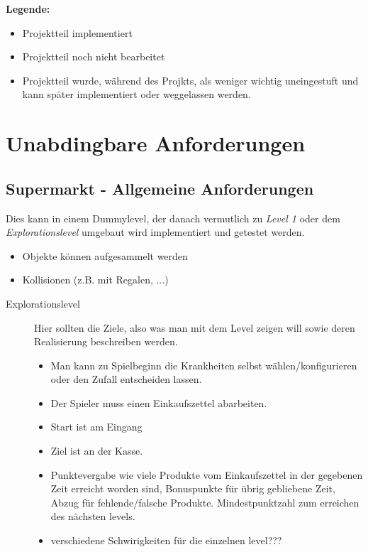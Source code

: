 ﻿\documentclass[a4paper, 11pt]{scrartcl}
\title{\documenttitle}
\author{\authors}
\date{\dateversion}
\newcommand{\fertig}{\color{ForestGreen}}
\newcommand{\unwichtig}{\color{Gray}}
\begin{document}
\maketitle

{\bfseries Legende:}
\begin{itemize}
    \item {\fertig Projektteil implementiert}
    \item {Projektteil noch nicht bearbeitet}
    \item {\unwichtig Projektteil wurde, während des Projkts, als weniger
    wichtig uneingestuft und kann später implementiert oder weggelassen werden.}
\end{itemize}

\section{Unabdingbare Anforderungen}
\subsection{Supermarkt - Allgemeine Anforderungen}
Dies kann in einem Dummylevel, der danach vermutlich zu \emph{Level 1}
oder dem \emph{Explorationslevel} umgebaut wird implementiert und
getestet werden.
\begin{itemize}
    \item Objekte können aufgesammelt werden
    \item Kollisionen (z.B. mit Regalen, ...)
\end{itemize}
%
%
\begin{description}
    \item[Explorationslevel}
    Ein Level in dem man keine Aufgaben erledigen muss aber verschiedene
    Krankheiten testen kann. Dh. man kann zur Laufzeit Krankheiten
    "zu- und abschalten" und diese auch zur Laufzeit dynamisch
    konfigurieren. → GUI
    \item[Level 1]
    Hier sollten die Ziele, also was man mit dem Level zeigen will sowie
    deren Realisierung beschreiben werden.\\
    \begin{itemize}
        \item Man kann zu Spielbeginn die Krankheiten selbst
        wählen/konfigurieren oder den Zufall entscheiden lassen.
        \item Der Spieler muss einen Einkaufszettel abarbeiten.
        \item Start ist am Eingang
        \item Ziel ist an der Kasse.
        \item Punktevergabe wie viele Produkte vom Einkaufszettel in der gegebenen Zeit erreicht worden sind,             Bonuspunkte für übrig gebliebene Zeit, Abzug für fehlende/falsche Produkte. Mindestpunktzahl zum erreichen         des nächsten levels.
        \item verschiedene Schwirigkeiten für die einzelnen level???
    \end{itemize}
\end{description}
\end{document}
